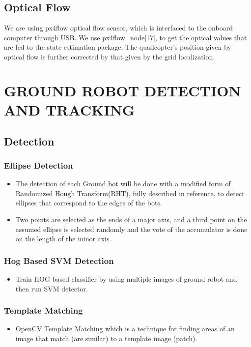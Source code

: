 \documentclass[12pt]{article}
\begin{document}
\subsection{Optical Flow}
We are using px4flow optical flow sensor, which is interfaced to the onboard computer through USB. We use px4flow\_node[17], to get the optical values that are fed to the state estimation package. The quadcopter's position given by optical flow is further corrected by that given by the grid localization. 


\section{GROUND ROBOT DETECTION AND TRACKING}
    \subsection{Detection}
        \subsubsection{Ellipse Detection}
            \begin{itemize}
                \item The detection of each Ground bot will be done with a modified form of Randomized Hough Transform(RHT), fully described in reference, to detect ellipses that correspond to the edges of the bots. 
                \item Two points are selected as the ends of a major axis, and a third point on the assumed ellipse is selected randomly and the vote of the accumulator is done on the length of the minor axis.
            
            \end{itemize}
        \subsubsection{Hog Based SVM Detection}
            \begin{itemize}
                \item Train HOG based classifier by using multiple images of ground robot and then run SVM detector.
            \end{itemize}
        \subsubsection{Template Matching}
            \begin{itemize}
                \item OpenCV Template Matching which is a technique for finding areas of an image that match (are similar) to a template image (patch).
            \end{itemize}
\end{document}
